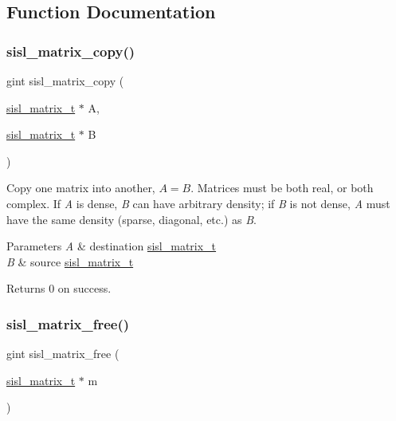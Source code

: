 \subsection{Function Documentation}
\mbox{\label{group__matrix_ga76214ff23ddf1c1175d918868ba29b97}} 
\subsubsection{\texorpdfstring{sisl\+\_\+matrix\+\_\+copy()}{sisl\_matrix\_copy()}}
{\footnotesize\ttfamily gint sisl\+\_\+matrix\+\_\+copy (\begin{DoxyParamCaption}\item[{\mbox{\hyperlink{group__matrix_gad147923587b355644defb9bfbf981740}{sisl\+\_\+matrix\+\_\+t}} $\ast$}]{A,  }\item[{\mbox{\hyperlink{group__matrix_gad147923587b355644defb9bfbf981740}{sisl\+\_\+matrix\+\_\+t}} $\ast$}]{B }\end{DoxyParamCaption})}

Copy one matrix into another, $A=B$. Matrices must be both real, or both complex. If {\itshape A} is dense, {\itshape B} can have arbitrary density; if {\itshape B} is not dense, {\itshape A} must have the same density (sparse, diagonal, etc.) as {\itshape B}.


\begin{DoxyParams}{Parameters}
{\em A} & destination \mbox{\hyperlink{group__matrix_gad147923587b355644defb9bfbf981740}{sisl\+\_\+matrix\+\_\+t}} \\
\hline
{\em B} & source \mbox{\hyperlink{group__matrix_gad147923587b355644defb9bfbf981740}{sisl\+\_\+matrix\+\_\+t}}\\
\hline
\end{DoxyParams}
\begin{DoxyReturn}{Returns}
0 on success. 
\end{DoxyReturn}
\mbox{\label{group__matrix_ga35de2cf4acfbe6e820f895a2ace8b328}} 
\subsubsection{\texorpdfstring{sisl\+\_\+matrix\+\_\+free()}{sisl\_matrix\_free()}}
{\footnotesize\ttfamily gint sisl\+\_\+matrix\+\_\+free (\begin{DoxyParamCaption}\item[{\mbox{\hyperlink{group__matrix_gad147923587b355644defb9bfbf981740}{sisl\+\_\+matrix\+\_\+t}} $\ast$}]{m }\end{DoxyParamCaption})}

